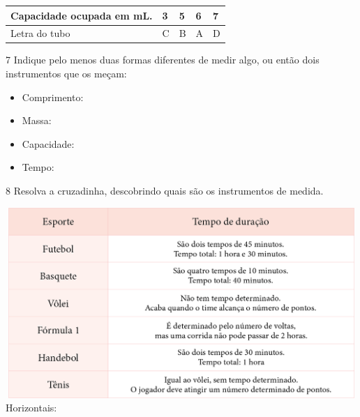 \begin{longtable}[]{@{}lllll@{}}
\toprule
Capacidade ocupada em mL. & 3 & 5 & 6 & 7\tabularnewline
\midrule
\endhead
Letra do tubo & C & B & A & D\tabularnewline
\bottomrule
\end{longtable}

\num{7} Indique pelo menos duas formas diferentes de medir algo, ou então dois
instrumentos que os meçam:

\begin{itemize}
\item Comprimento:


\item Massa:


\item Capacidade:


\item Tempo:

\end{itemize}


\num{8} Resolva a cruzadinha, descobrindo quais são os instrumentos de medida.


\includegraphics[width=6.14865in,height=2.84375in]{media/image48.png}Horizontais:

